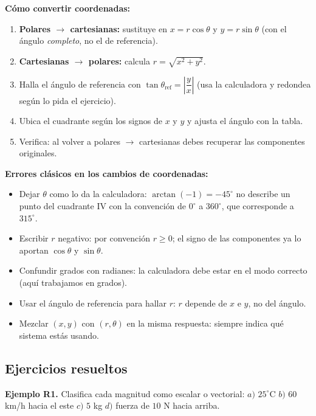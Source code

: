 \documentclass[12pt, letterpaper]{article}
\providecommand{\sen}{\sin}
\begin{document}
\begin{cuadropasos}
  \textbf{Cómo convertir coordenadas:}
  \begin{enumerate}[leftmargin=*]
    \item \textbf{Polares $\to$ cartesianas:} sustituye en $x = r\cos\theta$ y $y = r\sen\theta$ (con el ángulo \emph{completo}, no el de referencia).
    \item \textbf{Cartesianas $\to$ polares:} calcula $r = \sqrt{x^2 + y^2}$.
    \item Halla el ángulo de referencia con $\tan\theta_{\text{ref}} = \left|\dfrac{y}{x}\right|$ (usa la calculadora y redondea según lo pida el ejercicio).
    \item Ubica el cuadrante según los signos de $x$ y $y$ y ajusta el ángulo con la tabla.
    \item Verifica: al volver a polares $\to$ cartesianas debes recuperar las componentes originales.
  \end{enumerate}
\end{cuadropasos}

\begin{cuadroadvertencia}
  \textbf{Errores clásicos en los cambios de coordenadas:}
  \begin{itemize}[leftmargin=*]
    \item Dejar $\theta$ como lo da la calculadora: $\arctan(-1) = -45^{\circ}$ no describe un punto del cuadrante IV con la convención de $0^{\circ}$ a $360^{\circ}$, que corresponde a $315^{\circ}$.
    \item Escribir $r$ negativo: por convención $r \ge 0$; el signo de las componentes ya lo aportan $\cos\theta$ y $\sen\theta$.
    \item Confundir grados con radianes: la calculadora debe estar en el modo correcto (aquí trabajamos en grados).
    \item Usar el ángulo de referencia para hallar $r$: $r$ depende de $x$ e $y$, no del ángulo.
    \item Mezclar $(x,y)$ con $(r,\theta)$ en la misma respuesta: siempre indica qué sistema estás usando.
  \end{itemize}
\end{cuadroadvertencia}

\subsection{Ejercicios resueltos}

\textbf{Ejemplo R1.} Clasifica cada magnitud como escalar o vectorial: $a)$ $25^{\circ}$C \quad $b)$ $60$ km/h hacia el este \quad $c)$ $5$ kg \quad $d)$ fuerza de $10$ N hacia arriba.
\end{document}
